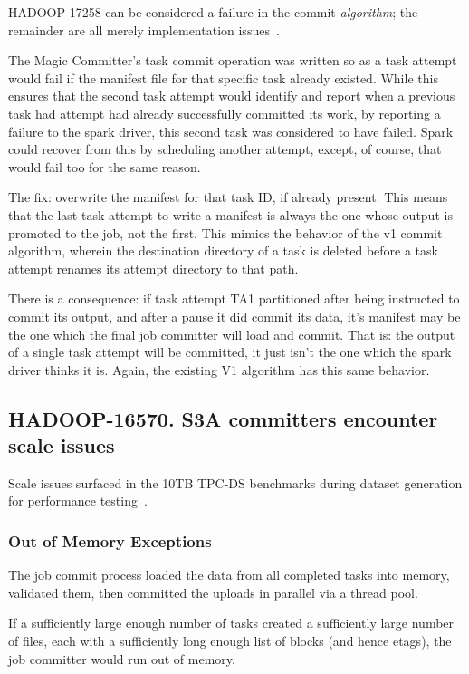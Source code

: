 \documentclass[conference]{IEEEtran}
\begin{document}
HADOOP-17258 can be considered a failure in the commit \emph{algorithm};
the remainder are all merely implementation issues\ \cite{HADOOP-17258}.

The Magic Committer's task commit operation was written so as
a task attempt would fail if the manifest file for that specific task already existed.
While this ensures that the second task attempt would identify and report when a previous
task had attempt had already successfully committed its work, by reporting a failure
to the spark driver, this second task was considered to have failed.
Spark could recover from this by scheduling another attempt, except, of course,
that would fail too for the same reason.

The fix: overwrite the manifest for that task ID, if already present.
This means that the last task attempt to write a manifest is always the one
whose output is promoted to the job, not the first.
This mimics the behavior of the v1 commit algorithm, wherein the destination directory
of a task is deleted before a task attempt renames its attempt directory to that path.

There is a consequence: if task attempt TA1 partitioned after being instructed
to commit its output, and after a pause it did commit its data, it's manifest
may be the one which the final job committer will load and commit.
That is: the output of a single task attempt will be committed, it just
isn't the one which the spark driver thinks it is.
Again, the existing V1 algorithm has this same behavior.

\subsection{HADOOP-16570. S3A committers encounter scale issues}
\label{subsec:scale}


Scale issues surfaced in the 10TB TPC-DS benchmarks during dataset generation
for performance testing\ \cite{HADOOP-16570}.

\subsubsection{Out of Memory Exceptions}

The job commit process loaded the data from all completed tasks into memory,
validated them, then committed the uploads in parallel via a thread pool.

If a sufficiently large enough number of tasks created a sufficiently large
number of files, each with a sufficiently long enough list of blocks
(and hence etags), the job committer would run out of memory.
\end{document}
